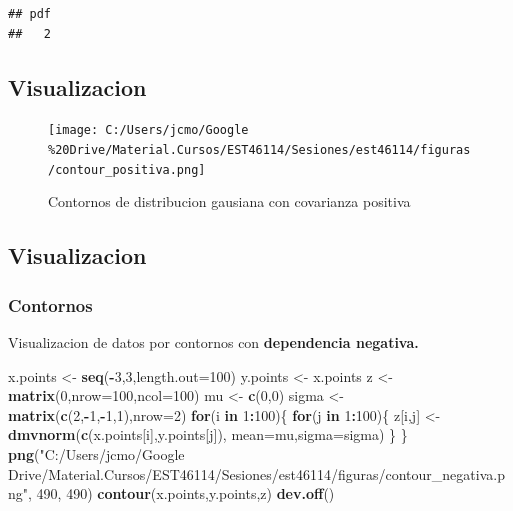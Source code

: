 \documentclass[11pt,]{article}
\newenvironment{Shaded}{\begin{snugshade}}{\end{snugshade}}
\newcommand{\KeywordTok}[1]{\textcolor[rgb]{0.13,0.29,0.53}{\textbf{#1}}}
\newcommand{\DataTypeTok}[1]{\textcolor[rgb]{0.13,0.29,0.53}{#1}}
\newcommand{\DecValTok}[1]{\textcolor[rgb]{0.00,0.00,0.81}{#1}}
\newcommand{\StringTok}[1]{\textcolor[rgb]{0.31,0.60,0.02}{#1}}
\newcommand{\ControlFlowTok}[1]{\textcolor[rgb]{0.13,0.29,0.53}{\textbf{#1}}}
\newcommand{\OperatorTok}[1]{\textcolor[rgb]{0.81,0.36,0.00}{\textbf{#1}}}
\newcommand{\NormalTok}[1]{#1}
\begin{document}
\begin{verbatim}
## pdf 
##   2
\end{verbatim}

\subsection{Visualizacion}\label{visualizacion-4}

\begin{figure}
\centering
\texttt{[image: C:/Users/jcmo/Google\\\%20Drive/Material.Cursos/EST46114/Sesiones/est46114/figuras/contour\_positiva.png]}
\caption{Contornos de distribucion gausiana con covarianza positiva}
\end{figure}

\subsection{Visualizacion}\label{visualizacion-5}

\subsubsection{Contornos}\label{contornos-3}

Visualizacion de datos por contornos con \textbf{dependencia negativa.}

\begin{Shaded}
\begin{Highlighting}[]
\NormalTok{x.points <-}\StringTok{ }\KeywordTok{seq}\NormalTok{(}\OperatorTok{-}\DecValTok{3}\NormalTok{,}\DecValTok{3}\NormalTok{,}\DataTypeTok{length.out=}\DecValTok{100}\NormalTok{)}
\NormalTok{y.points <-}\StringTok{ }\NormalTok{x.points}
\NormalTok{z <-}\StringTok{ }\KeywordTok{matrix}\NormalTok{(}\DecValTok{0}\NormalTok{,}\DataTypeTok{nrow=}\DecValTok{100}\NormalTok{,}\DataTypeTok{ncol=}\DecValTok{100}\NormalTok{)}
\NormalTok{mu <-}\StringTok{ }\KeywordTok{c}\NormalTok{(}\DecValTok{0}\NormalTok{,}\DecValTok{0}\NormalTok{)}
\NormalTok{sigma <-}\StringTok{ }\KeywordTok{matrix}\NormalTok{(}\KeywordTok{c}\NormalTok{(}\DecValTok{2}\NormalTok{,}\OperatorTok{-}\DecValTok{1}\NormalTok{,}\OperatorTok{-}\DecValTok{1}\NormalTok{,}\DecValTok{1}\NormalTok{),}\DataTypeTok{nrow=}\DecValTok{2}\NormalTok{)}
\ControlFlowTok{for}\NormalTok{(i }\ControlFlowTok{in} \DecValTok{1}\OperatorTok{:}\DecValTok{100}\NormalTok{)\{}
  \ControlFlowTok{for}\NormalTok{(j }\ControlFlowTok{in} \DecValTok{1}\OperatorTok{:}\DecValTok{100}\NormalTok{)\{}
\NormalTok{    z[i,j] <-}\StringTok{ }\KeywordTok{dmvnorm}\NormalTok{(}\KeywordTok{c}\NormalTok{(x.points[i],y.points[j]),}
                      \DataTypeTok{mean=}\NormalTok{mu,}\DataTypeTok{sigma=}\NormalTok{sigma)}
\NormalTok{    \}}
\NormalTok{\}}
\KeywordTok{png}\NormalTok{(}\StringTok{"C:/Users/jcmo/Google Drive/Material.Cursos/EST46114/Sesiones/est46114/figuras/contour_negativa.png"}\NormalTok{, }\DecValTok{490}\NormalTok{, }\DecValTok{490}\NormalTok{)}
\KeywordTok{contour}\NormalTok{(x.points,y.points,z)}
\KeywordTok{dev.off}\NormalTok{()}
\end{Highlighting}
\end{Shaded}
\end{document}
